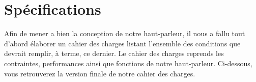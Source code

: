 \newenvironment{changemargin}[2]{\begin{list}{}{%
\setlength{\topsep}{0pt}%
\setlength{\leftmargin}{0pt}%
\setlength{\rightmargin}{0pt}%
\setlength{\listparindent}{\parindent}%
\setlength{\itemindent}{\parindent}%
\setlength{\parsep}{0pt plus 1pt}%
\addtolength{\leftmargin}{#1}%
\addtolength{\rightmargin}{#2}%
}\item }{\end{list}}
%

\section{Spécifications}

Afin de mener a bien la conception de notre haut-parleur, il nous a fallu tout d’abord élaborer un cahier des 
charges listant l’ensemble des conditions que devrait remplir, à terme, ce dernier. Le cahier des charges reprends 
les contraintes, performances ainsi que fonctions de notre haut-parleur. Ci-dessous, vous retrouverez la version 
finale de notre cahier des charges. 

